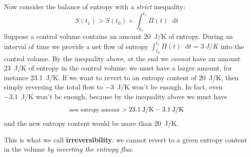 \documentclass[a4paper,12pt,%
onecolumn,oneside,%
british%
]{memoir}
\newcommand*{\di}{\mathop{}\!\mathrm{d}}%
\renewcommand*{\|}[1][]{\nonscript\:#1\vert\nonscript\:\mathopen{}}
\newcommand*{\yti}{t_{0}}
\newcommand*{\ytf}{t_{1}}
\newcommand*{\dt}{\di t}
\newcommand*{\yS}{S}
\newcommand*{\yB}{\varPi}
\begin{document}
Now consider the balance of entropy with a \emph{strict} inequality:
\begin{equation*}
  \yS(\ytf) > \yS(\yti) + \int_{\yti}^{\ytf}\!\!\yB(t)\dt
\end{equation*}
%
%
Suppose a control volume contains an amount \qty{20}{J/K} of entropy. During an interval of time we provide a net flow of entropy $\int_{\yti}^{\ytf}\!\!\yB(t)\dt = \qty{3}{J/K}$ into the control volume. By the inequality above, at the end we \emph{cannot} have an amount \qty{23}{J/K} of entropy in the control volume: we must have a larger amount, for instance \qty{23.1}{J/K}. If we want to revert to an entropy content of \qty{20}{J/K}, then simply reversing the total flow to \qty{-3}{J/K} won't be enough.
In fact, even \qty{-3.1}{J/K} won't be enough, because by the inequality above we must have
\begin{equation*}
  \text{\footnotesize new entropy amount} > \qty{23.1}{J/K} - \qty{3.1}{J/K}
\end{equation*}
and the new entropy content would be more than \qty{20}{J/K}.

This is what we call \textbf{irreversibility}: we cannot revert to a given entropy content in the volume \emph{by inverting the entropy flux}.
\end{document}

